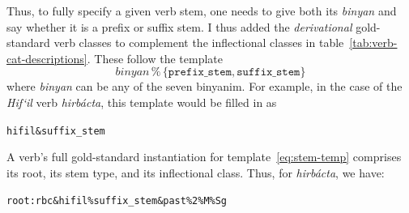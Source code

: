 { Thus, to fully specify a given verb stem, one needs to give both its \emph{binyan} and say whether it is a prefix or suffix stem. I thus added the \emph{derivational} gold-standard verb classes to complement the inflectional classes in table~\ref{tab:verb-cat-descriptions}. These follow the template
 \begin{equation}\label{eq:stem-temp}
\textit{binyan}  \, \texttt{\%} \, \{ \texttt{prefix\_stem}, \texttt{suffix\_stem} \}
 \end{equation}
 where \textit{binyan} can be any of the seven binyanim. For example, in the case of the \emph{Hif`il} verb \textit{hirb\'{a}cta}, this template would be filled in as 
  \begin{center}
    \texttt{hifil\&suffix\_stem}
  \end{center}
 A verb's full gold-standard instantiation for template~\eqref{eq:stem-temp} comprises its root, its stem type, and its inflectional class. Thus, for \textit{hirb\'{a}cta}, we have:
\begin{center}
\texttt{root:rbc\&hifil\%suffix\_stem\&past\%2\%M\%Sg}
 \end{center}
 
}
